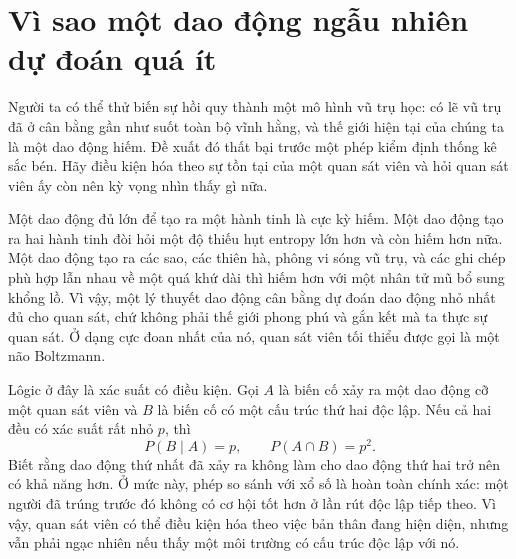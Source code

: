 \section{Vì sao một dao động ngẫu nhiên dự đoán quá ít}

Người ta có thể thử biến sự hồi quy thành một mô hình vũ trụ học: có lẽ vũ trụ đã ở cân bằng gần như suốt toàn bộ vĩnh hằng, và thế giới hiện tại của chúng ta là một dao động hiếm. Đề xuất đó thất bại trước một phép kiểm định thống kê sắc bén. Hãy điều kiện hóa theo sự tồn tại của một quan sát viên và hỏi quan sát viên ấy còn nên kỳ vọng nhìn thấy gì nữa.

Một dao động đủ lớn để tạo ra một hành tinh là cực kỳ hiếm. Một dao động tạo ra hai hành tinh đòi hỏi một độ thiếu hụt entropy lớn hơn và còn hiếm hơn nữa. Một dao động tạo ra các sao, các thiên hà, phông vi sóng vũ trụ, và các ghi chép phù hợp lẫn nhau về một quá khứ dài thì hiếm hơn với một nhân tử mũ bổ sung khổng lồ. Vì vậy, một lý thuyết dao động cân bằng dự đoán dao động nhỏ nhất đủ cho quan sát, chứ không phải thế giới phong phú và gắn kết mà ta thực sự quan sát. Ở dạng cực đoan nhất của nó, quan sát viên tối thiểu được gọi là một não Boltzmann.

Lôgic ở đây là xác suất có điều kiện. Gọi \(A\) là biến cố xảy ra một dao động cỡ một quan sát viên và \(B\) là biến cố có một cấu trúc thứ hai độc lập. Nếu cả hai đều có xác suất rất nhỏ \(p\), thì
\begin{equation}
 P(B\mid A)=p,
 \qquad
 P(A\cap B)=p^2.
 \label{eq:sm8-conditional-fluctuations}
\end{equation}
Biết rằng dao động thứ nhất đã xảy ra không làm cho dao động thứ hai trở nên có khả năng hơn. Ở mức này, phép so sánh với xổ số là hoàn toàn chính xác: một người đã trúng trước đó không có cơ hội tốt hơn ở lần rút độc lập tiếp theo. Vì vậy, quan sát viên có thể điều kiện hóa theo việc bản thân đang hiện diện, nhưng vẫn phải ngạc nhiên nếu thấy một môi trường có cấu trúc độc lập với nó.

\begin{classroomqa}
\end{classroomqa}

